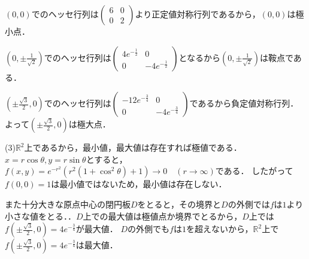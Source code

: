 \documentclass[
		book,
		head_space=20mm,
		foot_space=20mm,
		gutter=10mm,
		line_length=190mm
]{jlreq}
\begin{document}
$(0,0)$でのヘッセ行列は$\begin{pmatrix}
6&0\\
0&2
\end{pmatrix}$より正定値対称行列であるから，$(0,0)$は極小点．

$(0,\pm\frac{1}{\sqrt{2}})$でのヘッセ行列は$\begin{pmatrix}
4e^{-\frac{1}{2}}&0\\
0&-4 e^{-\frac{1}{2}}
\end{pmatrix}$となるから$(0,\pm\frac{1}{\sqrt{2}})$は鞍点である．

$(\pm\frac{\sqrt{3}}{2},0)$でのヘッセ行列は$\begin{pmatrix}
-12e^{-\frac{3}{4}}&0\\
0&-4e^{-\frac{3}{4}}
\end{pmatrix}$であるから負定値対称行列．
よって$(\pm \frac{\sqrt{3}}{2},0)$は極大点．

(3)$\mathbb{R}^2$上であるから，最小値，最大値は存在すれば極値である．
$x=r\cos \theta,y=r\sin \theta$とすると，$f(x,y)=e^{-r^2}(r^2(1+\cos^2\theta)+1)\rightarrow 0\quad(r\to\infty)$である．
したがって$f(0,0)=1$は最小値ではないため，最小値は存在しない．

また十分大きな原点中心の閉円板$D$をとると，その境界と$D$の外側では$f$は$1$より小さな値をとる．．$D$上での最大値は極値点か境界でとるから，$D$上では
$f(\pm\frac{\sqrt{3}}{2},0)=4e^{-\frac{3}{4}}$が最大値．
$D$の外側でも$f$は$1$を超えないから，$\mathbb{R}^2$上で$f(\pm\frac{\sqrt{3}}{2},0)=4e^{-\frac{3}{4}}$は最大値．
\end{document}
